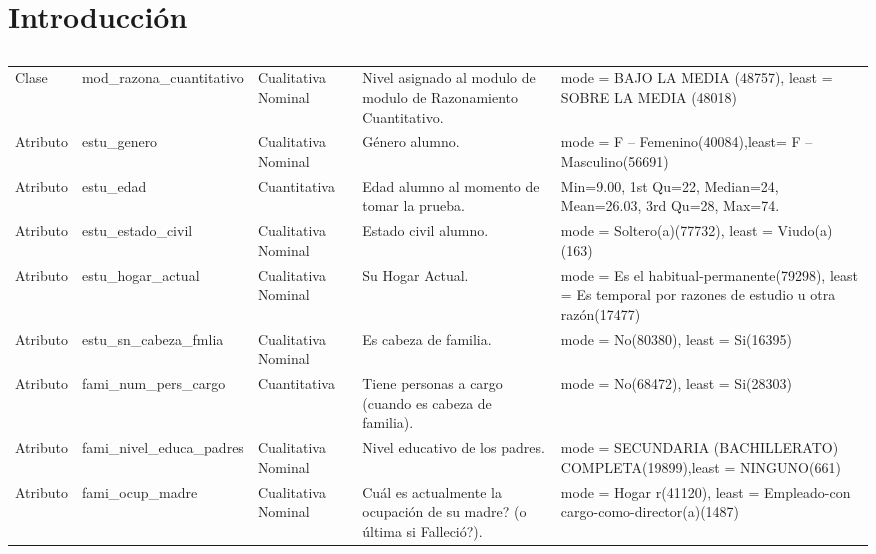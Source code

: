 \section{Introducción}
\begin{table}[H]
\caption{}
\begin{flushleft}
\begin{tabular}{|>{\centering\arraybackslash}m{2cm}|>{\arraybackslash}m{4cm}|>{\arraybackslash}m{2cm}|>{\arraybackslash}m{3cm}|>{\arraybackslash}m{4cm}| }
\hline
  \rowcolor{blue!55}  
\multicolumn{1}{|c|}{Atributo/
Clase} & \multicolumn{1}{c|}{Nombre} & \multicolumn{1}{c|}{Tipo} & \multicolumn{1}{c|}{Descripción} & \multicolumn{1}{c|}{Estadística} \\ \hline
Clase & mod\_razona\_cuantitativo & Cualitativa Nominal & Nivel asignado al modulo de modulo de Razonamiento Cuantitativo. & mode = BAJO LA MEDIA (48757),
 least = SOBRE LA MEDIA  (48018) \\ \hline
Atributo & estu\_genero & Cualitativa Nominal & Género alumno. & mode = F – Femenino(40084),least= F – Masculino(56691) \\ \hline
Atributo & estu\_edad & Cuantitativa & Edad alumno al momento de tomar la prueba. & Min=9.00, 1st Qu=22, Median=24,    Mean=26.03, 3rd Qu=28, Max=74. \\ \hline
Atributo & estu\_estado\_civil & Cualitativa Nominal & Estado civil alumno. & mode = Soltero(a)(77732), least = Viudo(a)(163) \\ \hline
Atributo & estu\_hogar\_actual & Cualitativa Nominal & Su Hogar Actual. & mode = Es el habitual-permanente(79298),
least = Es temporal por razones de estudio u otra razón(17477) \\ \hline
Atributo & estu\_sn\_cabeza\_fmlia & Cualitativa Nominal & Es cabeza de familia. & mode = No(80380), least = Si(16395) \\ \hline
Atributo & fami\_num\_pers\_cargo & Cuantitativa & Tiene personas a cargo (cuando es cabeza
de familia). & mode = No(68472), least = Si(28303) \\ \hline
Atributo & fami\_nivel\_educa\_padres & Cualitativa Nominal & 
Nivel educativo de los padres. & mode = SECUNDARIA (BACHILLERATO) COMPLETA(19899),least = NINGUNO(661) \\ \hline
Atributo & fami\_ocup\_madre & Cualitativa Nominal & Cuál es actualmente la ocupación de su madre? (o última si Falleció?). & mode = Hogar r(41120), least = Empleado-con cargo-como-director(a)(1487) \\ \hline

\end{tabular}
\end{flushleft}
\end{table}
